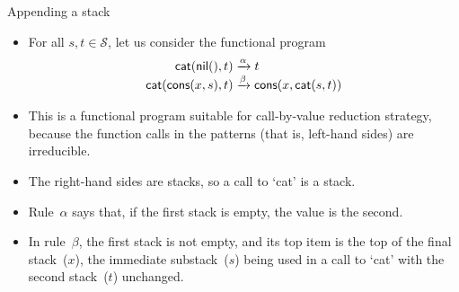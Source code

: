 \documentclass[compress,dvipdfmx]{beamer}
\newcommand\fun[1]{\textsf{#1}}
\begin{document}
%
\begin{frame}{Appending a stack}

  \begin{itemize}

    \item For all \(s, t \in \mathcal{S}\), let us consider the
      functional program
      \begin{align*}
        \fun{cat}(\fun{nil}(),t) &\xrightarrow{\alpha} t\\
        \fun{cat}(\fun{cons}(x,s),t) &\xrightarrow{\smash\beta}
        \fun{cons}(x,\fun{cat}(s,t))
      \end{align*}

    \item This is a functional program suitable for
      call\hyp{}by\hyp{}value reduction strategy, because the function
      calls in the patterns (that is, left\hyp{}hand sides) are
      irreducible.

    \item The right\hyp{}hand sides are stacks, so a call to
      `\fun{cat}' is a stack.

    \item Rule~\(\alpha\) says that, if the first stack is empty, the
      value is the second.

    \item In rule~\(\beta\), the first stack is not empty, and its top
      item is the top of the final stack~(\(x\)), the immediate
      substack~(\(s\)) being used in a call to `\fun{cat}' with the
      second stack~(\(t\)) unchanged.

  \end{itemize}

\end{frame}
\end{document}
